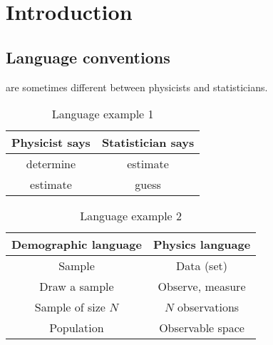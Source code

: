 

\cleardoublepage
\chapter{Introduction} %
\label{ch:intro}

\section{Language conventions}

 are sometimes different between physicists and statisticians.

\begin{table} %
	\centering %
	\begin{tabular}{c c} %
		\toprule %
		Physicist says & Statistician says\\ %
		\midrule %
		determine & estimate\\ %
		estimate & guess\\ %
		\bottomrule %
	\end{tabular}
	\caption{Language example 1} %
	\label{tab:LangEx1} %
\end{table}

\begin{table}
	\centering
	\begin{tabular}{c c}
		\toprule
		Demographic language & Physics language\\
		\midrule
		Sample & Data (set)\\
		Draw a sample & Observe, measure\\
		Sample of size $N$ & $N$ observations \\
		Population & Observable space\\
		\bottomrule
	\end{tabular}
	\caption{Language example 2}
	\label{tab:LangEx2}
\end{table}

